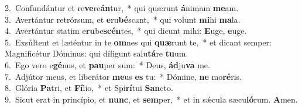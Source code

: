 {2.~}Confundántur et re\textbf{ve}re\textbf{án}tur,~* qui quærunt \textbf{á}nimam \textbf{me}am.\\
{3.~}Avertántur retrórsum, et \textbf{e}ru\textbf{bé}scant,~* qui volunt \textbf{mi}hi \textbf{ma}la.\\
{4.~}Avertántur statim e\textbf{ru}be\textbf{scén}tes,~* qui dicunt mihi: \textbf{E}uge, \textbf{e}uge.\\
{5.~}Exsúltent et læténtur in te \textbf{om}nes qui \textbf{quæ}runt te,~* et dicant semper: Magnificétur Dóminus: qui díligunt salu\textbf{tá}re \textbf{tu}um.\\
{6.~}Ego vero e\textbf{gé}nus, et \textbf{pau}per sum:~* Deus, \textbf{ád}ju\textbf{va} me.\\
{7.~}Adjútor meus, et liberátor \textbf{me}us \textbf{es} tu:~* Dómine, \textbf{ne} mo\textbf{ré}ris.\\
{8.~}Glória \textbf{Pa}tri, et \textbf{Fí}lio,~* et Spi\textbf{rí}tui \textbf{San}cto.\\
{9.~}Sicut erat in princípio, et \textbf{nunc}, et \textbf{sem}per,~* et in sǽcula sæcu\textbf{ló}rum. \textbf{A}men.\\
